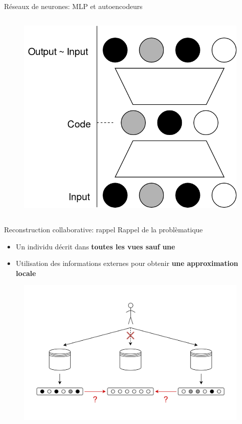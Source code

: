 \documentclass[hyperref={pdfpagelabels=false}]{beamer}
\begin{document}
\begin{frame}{Réseaux de neurones: MLP et autoencodeurs}
\begin{columns}
\begin{column}{0.5 \textwidth}
\begin{figure}[h]
                    \includegraphics[scale=.18]{ae}
                \end{figure}
            \end{column}
        \end{columns}
    \end{frame}

    \begin{frame}{Reconstruction collaborative: rappel}
        Rappel de la problèmatique
        \begin{itemize}
            \item Un individu décrit dans \textbf{toutes les vues sauf une}
            \item Utilisation des informations externes pour obtenir \textbf{une 
                approximation locale}
        \end{itemize}
        \vspace{-0.5cm}
        \begin{figure}[b]
            \centering
            \includegraphics[scale=.21]{idee_reconstruction_collaborative7}
        \end{figure}
    \end{frame}
\end{document}
